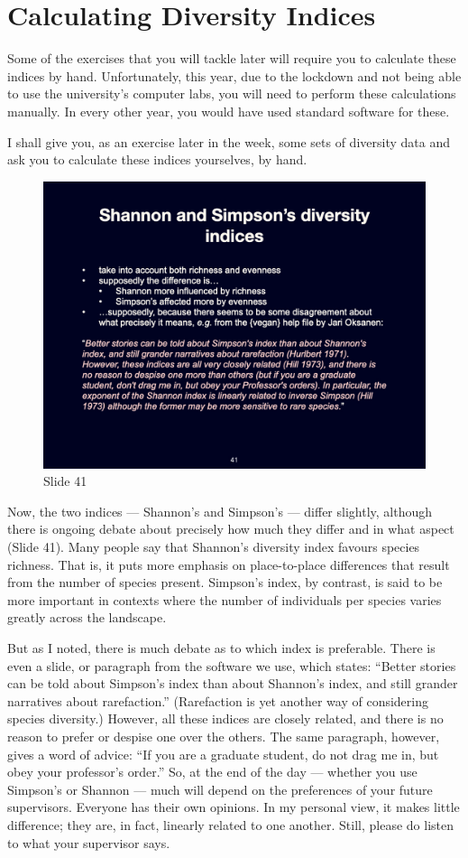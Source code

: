 \documentclass[
  10pt,
]{book}
\begin{document}
\section{Calculating Diversity
Indices}\label{calculating-diversity-indices}

Some of the exercises that you will tackle later will require you to
calculate these indices by hand. Unfortunately, this year, due to the
lockdown and not being able to use the university's computer labs, you
will need to perform these calculations manually. In every other year,
you would have used standard software for these.

I shall give you, as an exercise later in the week, some sets of
diversity data and ask you to calculate these indices yourselves, by
hand.

\begin{figure}[ht]
\centering
\includegraphics[width=0.8\linewidth]{../images/BDC334/BDC334-041.jpeg}
\caption*{Slide 41}
\end{figure}

Now, the two indices --- Shannon's and Simpson's --- differ slightly,
although there is ongoing debate about precisely how much they differ
and in what aspect (Slide 41). Many people say that Shannon's diversity
index favours species richness. That is, it puts more emphasis on
place-to-place differences that result from the number of species
present. Simpson's index, by contrast, is said to be more important in
contexts where the number of individuals per species varies greatly
across the landscape.

But as I noted, there is much debate as to which index is preferable.
There is even a slide, or paragraph from the software we use, which
states: ``Better stories can be told about Simpson's index than about
Shannon's index, and still grander narratives about rarefaction.''
(Rarefaction is yet another way of considering species diversity.)
However, all these indices are closely related, and there is no reason
to prefer or despise one over the others. The same paragraph, however,
gives a word of advice: ``If you are a graduate student, do not drag me
in, but obey your professor's order.'' So, at the end of the day ---
whether you use Simpson's or Shannon --- much will depend on the
preferences of your future supervisors. Everyone has their own opinions.
In my personal view, it makes little difference; they are, in fact,
linearly related to one another. Still, please do listen to what your
supervisor says.
\end{document}
